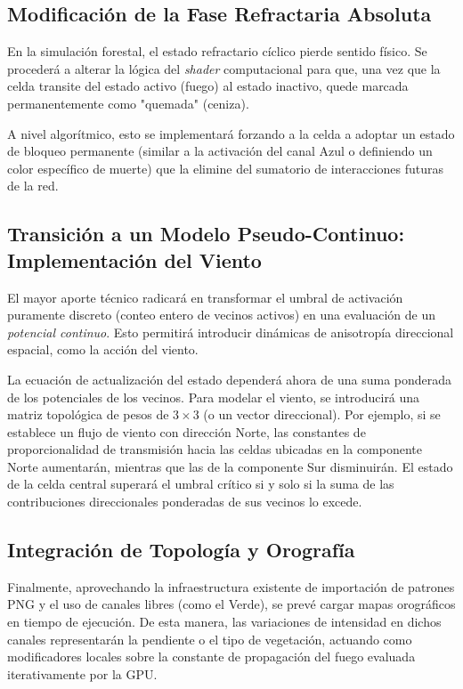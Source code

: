 \documentclass[12pt,a4paper]{article}
\begin{document}
\subsection{Modificación de la Fase Refractaria Absoluta}
En la simulación forestal, el estado refractario cíclico pierde sentido físico. Se procederá a alterar la lógica del \textit{shader} computacional para que, una vez que la celda transite del estado activo (fuego) al estado inactivo, quede marcada permanentemente como "quemada" (ceniza).

A nivel algorítmico, esto se implementará forzando a la celda a adoptar un estado de bloqueo permanente (similar a la activación del canal Azul o definiendo un color específico de muerte) que la elimine del sumatorio de interacciones futuras de la red.

\subsection{Transición a un Modelo Pseudo-Continuo: Implementación del Viento}
El mayor aporte técnico radicará en transformar el umbral de activación puramente discreto (conteo entero de vecinos activos) en una evaluación de un \textit{potencial continuo}. Esto permitirá introducir dinámicas de anisotropía direccional espacial, como la acción del viento.

La ecuación de actualización del estado dependerá ahora de una suma ponderada de los potenciales de los vecinos. Para modelar el viento, se introducirá una matriz topológica de pesos de $3\times3$ (o un vector direccional). Por ejemplo, si se establece un flujo de viento con dirección Norte, las constantes de proporcionalidad de transmisión hacia las celdas ubicadas en la componente Norte aumentarán, mientras que las de la componente Sur disminuirán. El estado de la celda central superará el umbral crítico si y solo si la suma de las contribuciones direccionales ponderadas de sus vecinos lo excede.

\subsection{Integración de Topología y Orografía}
Finalmente, aprovechando la infraestructura existente de importación de patrones PNG y el uso de canales libres (como el Verde), se prevé cargar mapas orográficos en tiempo de ejecución. De esta manera, las variaciones de intensidad en dichos canales representarán la pendiente o el tipo de vegetación, actuando como modificadores locales sobre la constante de propagación del fuego evaluada iterativamente por la GPU.
\end{document}
